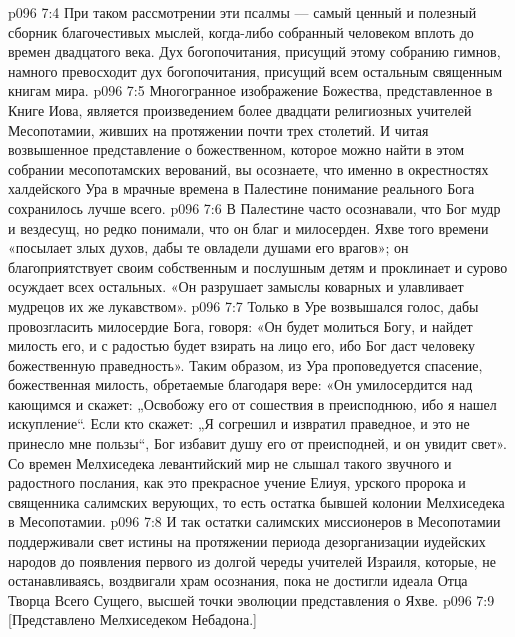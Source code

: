 \vs p096 7:4 При таком рассмотрении эти псалмы --- самый ценный и полезный сборник благочестивых мыслей, когда\hyp{}либо собранный человеком вплоть до времен двадцатого века. Дух богопочитания, присущий этому собранию гимнов, намного превосходит дух богопочитания, присущий всем остальным священным книгам мира.
\vs p096 7:5 \pc Многогранное изображение Божества, представленное в Книге Иова, является произведением более двадцати религиозных учителей Месопотамии, живших на протяжении почти трех столетий. И читая возвышенное представление о божественном, которое можно найти в этом собрании месопотамских верований, вы осознаете, что именно в окрестностях халдейского Ура в мрачные времена в Палестине понимание реального Бога сохранилось лучше всего.
\vs p096 7:6 В Палестине часто осознавали, что Бог мудр и вездесущ, но редко понимали, что он благ и милосерден. Яхве того времени «посылает злых духов, дабы те овладели душами его врагов»; он благоприятствует своим собственным и послушным детям и проклинает и сурово осуждает всех остальных. «Он разрушает замыслы коварных и улавливает мудрецов их же лукавством».
\vs p096 7:7 Только в Уре возвышался голос, дабы провозгласить милосердие Бога, говоря: «Он будет молиться Богу, и найдет милость его, и с радостью будет взирать на лицо его, ибо Бог даст человеку божественную праведность». Таким образом, из Ура проповедуется спасение, божественная милость, обретаемые благодаря вере: «Он умилосердится над кающимся и скажет: „Освобожу его от сошествия в преисподнюю, ибо я нашел искупление“. Если кто скажет: „Я согрешил и извратил праведное, и это не принесло мне пользы“, Бог избавит душу его от преисподней, и он увидит свет». Со времен Мелхиседека левантийский мир не слышал такого звучного и радостного послания, как это прекрасное учение Елиуя, урского пророка и священника салимских верующих, то есть остатка бывшей колонии Мелхиседека в Месопотамии.
\vs p096 7:8 И так остатки салимских миссионеров в Месопотамии поддерживали свет истины на протяжении периода дезорганизации иудейских народов до появления первого из долгой череды учителей Израиля, которые, не останавливаясь, воздвигали храм осознания, пока не достигли идеала Отца Творца Всего Сущего, высшей точки эволюции представления о Яхве.
\vsetoff
\vs p096 7:9 [Представлено Мелхиседеком Небадона.]
